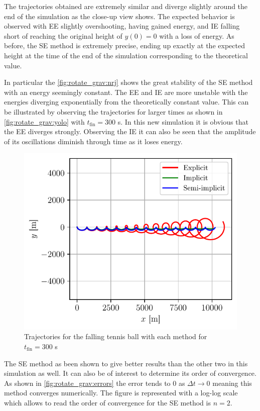 The trajectories obtained are extremely similar and diverge slightly around the end of the simulation as the close-up view shows. The expected behavior is observed with EE slightly overshooting, having gained energy, and IE falling short of reaching the original height of $y(0) = 0$ with a loss of energy. As before, the SE method is extremely precise, ending up exactly at the expected height at the time of the end of the simulation corresponding to the theoretical value.

In particular the \autoref{fig:rotate_grav:nrj} shows the great stability of the SE method with an energy seemingly constant. The EE and IE are more unstable with the energies diverging exponentially from the theoretically constant value. This can be illustrated by observing the trajectories for larger times as shown in \autoref{fig:rotate_grav:yolo} with $t_\mathrm{fin} = 300$ s. In this new simulation it is obvious that the EE diverges strongly. Observing the IE it can also be seen that the amplitude of its oscillations diminish through time as it loses energy.

\begin{figure}[h]
    \centering
    \includegraphics[width=0.61\linewidth]{figures/rotate_grav_trajectories_yolo.pdf}
    \caption{Trajectories for the falling tennis ball with each method for $t_\mathrm{fin} = 300$ s}
    \label{fig:rotate_grav:yolo}
\end{figure}


The SE method as been shown to give better results than the other two in this simulation as well. It can also be of interest to determine its order of convergence. As shown in \autoref{fig:rotate_grav:errors} the error tends to $0$ as $\Delta t \rightarrow 0$ meaning this method converges numerically. The figure is represented with a log-log scale which allows to read the order of convergence for the SE method is $n = 2$.

